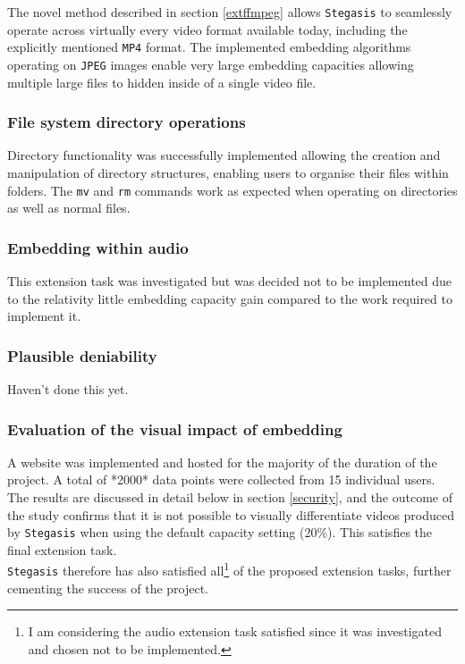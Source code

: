 \documentclass[paper=a4, fontsize=11pt,twoside]{scrartcl}    %
\numberwithin{table}{section}
\numberwithin{figure}{section}
\numberwithin{algorithm}{section}
\begin{document}
The novel method described in section \ref{extffmpeg} allows \texttt{Stegasis} to seamlessly operate across virtually every video format available today, including the explicitly mentioned \texttt{MP4} format. The implemented embedding algorithms operating on \texttt{JPEG} images enable very large embedding capacities allowing multiple large files to hidden inside of a single video file.

\subsubsection{File system directory operations}

Directory functionality was successfully implemented allowing the creation and manipulation of directory structures, enabling users to organise their files within folders. The \texttt{mv} and \texttt{rm} commands work as expected when operating on directories as well as normal files. 

\subsubsection{Embedding within audio}

This extension task was investigated but was decided not to be implemented due to the relativity little embedding capacity gain compared to the work required to implement it.

\subsubsection{Plausible deniability}

Haven't done this yet.

\subsubsection{Evaluation of the visual impact of embedding}

A website was implemented and hosted for the majority of the duration of the project. A total of *2000* data points were collected from 15 individual users. The results are discussed in detail below in section \ref{security}, and the outcome of the study confirms that it is not possible to visually differentiate videos produced by \texttt{Stegasis} when using the default capacity setting (20\%). This satisfies the final extension task.\\

\noindent
\texttt{Stegasis} therefore has also satisfied all\footnote{I am considering the audio extension task satisfied since it was investigated and chosen not to be implemented.} of the proposed extension tasks, further cementing the success of the project.
\end{document}
